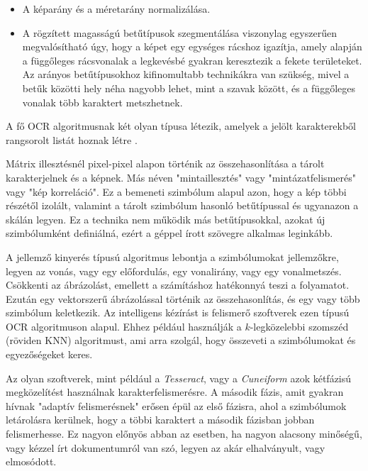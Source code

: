 \begin{itemize}
	\item A képarány és a méretarány normalizálása.
	
	\item A rögzített magasságú betűtípusok szegmentálása viszonylag egyszerűen megvalósítható úgy, hogy a képet egy egységes rácshoz igazítja, amely alapján a függőleges rácsvonalak a legkevésbé gyakran keresztezik a fekete területeket. Az arányos betűtípusokhoz kifinomultabb technikákra van szükség, mivel a betűk közötti hely néha nagyobb lehet, mint a szavak között, és a függőleges vonalak több karaktert metszhetnek.
\end{itemize}


A fő OCR algoritmusnak két olyan típusa létezik, amelyek a jelölt karakterekből rangsorolt listát hoznak létre \cite{bradski2000opencv}.

Mátrix illesztésnél pixel-pixel alapon történik az összehasonlítása a tárolt karakterjelnek és a képnek. Más néven "mintaillesztés" vagy "mintázatfelismerés" vagy "kép korreláció". Ez a bemeneti szimbólum alapul azon, hogy a kép többi részétől izolált, valamint a tárolt szimbólum hasonló betűtípussal és ugyanazon a skálán legyen. Ez a technika nem működik más betűtípusokkal, azokat új szimbólumként definiálná, ezért a géppel írott szövegre alkalmas leginkább.

A jellemző kinyerés típusú algoritmus lebontja a szimbólumokat jellemzőkre, legyen az vonás, vagy egy előfordulás, egy vonalirány, vagy egy vonalmetszés. Csökkenti az ábrázolást, emellett a számításhoz hatékonnyá teszi a folyamatot. Ezután egy vektorszerű ábrázolással történik az összehasonlítás, és egy vagy több szimbólum keletkezik. Az intelligens kézírást is felismerő szoftverek ezen típusú OCR algoritmuson alapul. Ehhez például használják a $k$-legközelebbi szomszéd (röviden KNN) algoritmust, ami arra szolgál, hogy összeveti a szimbólumokat és egyezőségeket keres.

Az olyan szoftverek, mint például a \textit{Tesseract}, vagy a \textit{Cuneiform} azok kétfázisú megközelítést használnak karakterfelismerésre. A második fázis, amit gyakran hívnak "adaptív felismerésnek" erősen épül az első fázisra, ahol a szimbólumok letárolásra kerülnek, hogy a többi karaktert a második fázisban jobban felismerhesse. Ez nagyon előnyös abban az esetben, ha nagyon alacsony minőségű, vagy kézzel írt dokumentumról van szó, legyen az akár elhalványult, vagy elmosódott.
